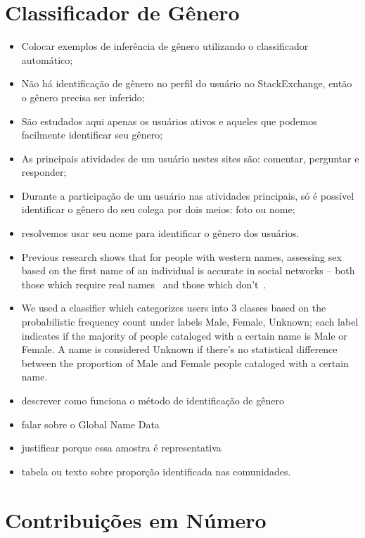 \section{Classificador de Gênero} %
\label{sub:classificador_de_g_nero}
\begin{itemize}
	\item Colocar exemplos de inferência de gênero utilizando o classificador automático;
	\item Não há identificação de gênero no perfil do usuário no StackExchange, então o gênero precisa ser inferido;
	\item São estudados aqui apenas os usuários ativos e aqueles que podemos facilmente identificar seu gênero;
	\item As principais atividades de um usuário nestes sites são: comentar, perguntar e responder;
	\item Durante a participação de um usuário nas atividades principais, só é possível identificar o gênero do seu colega por dois meios: foto ou nome;
	\item resolvemos usar seu nome para identificar o gênero dos usuários.
	\item Previous research shows that for people with western names, assessing sex based on the first name of an individual is accurate in social networks -- both those which require real names~\cite{tang2011s} and those which don't~\cite{burger2011discriminating}\cite{liu2013s}. 
	\item We used a classifier which categorizes users into 3 classes based on the probabilistic frequency count under labels Male, Female, Unknown; each label indicates if the majority of people cataloged with a certain name is Male or Female. A name is considered Unknown if there’s no statistical difference between the proportion of Male and Female people cataloged with a certain name.
	\item descrever como funciona o método de identificação de gênero
	\item falar sobre o Global Name Data
	\item justificar porque essa amostra é representativa
	\item tabela ou texto sobre proporção identificada nas comunidades.
\end{itemize}


\section{Contribuições em Número} %
\label{sub:contribui_es_em_numero}

